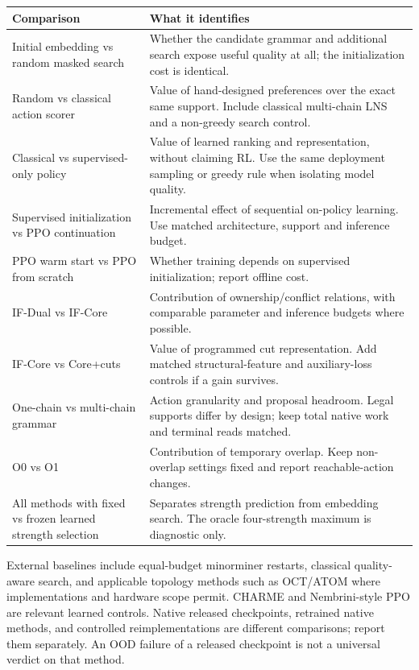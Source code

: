 \documentclass[11pt,a4paper]{article}
\theoremstyle{definition}\newtheorem{definition}[proposition]{Definition}
\begin{document}
{\small\begin{longtable}{@{}P{.24\textwidth}P{.69\textwidth}@{}}
\toprule
Comparison & What it identifies\\\midrule\endhead
Initial embedding vs random masked search & Whether the candidate grammar and additional search expose useful quality at all; the initialization cost is identical.\\
Random vs classical action scorer & Value of hand-designed preferences over the exact same support. Include classical multi-chain LNS and a non-greedy search control.\\
Classical vs supervised-only policy & Value of learned ranking and representation, without claiming RL. Use the same deployment sampling or greedy rule when isolating model quality.\\
Supervised initialization vs PPO continuation & Incremental effect of sequential on-policy learning. Use matched architecture, support and inference budget.\\
PPO warm start vs PPO from scratch & Whether training depends on supervised initialization; report offline cost.\\
IF-Dual vs IF-Core & Contribution of ownership/conflict relations, with comparable parameter and inference budgets where possible.\\
IF-Core vs Core+cuts & Value of programmed cut representation. Add matched structural-feature and auxiliary-loss controls if a gain survives.\\
One-chain vs multi-chain grammar & Action granularity and proposal headroom. Legal supports differ by design; keep total native work and terminal reads matched.\\
O0 vs O1 & Contribution of temporary overlap. Keep non-overlap settings fixed and report reachable-action changes.\\
All methods with fixed vs frozen learned strength selection & Separates strength prediction from embedding search. The oracle four-strength maximum is diagnostic only.\\
\bottomrule\end{longtable}}

External baselines include equal-budget minorminer restarts, classical quality-aware search, and applicable topology methods such as OCT/ATOM where implementations and hardware scope permit. CHARME and Nembrini-style PPO are relevant learned controls\cite{charme2024,nembrini2026}. Native released checkpoints, retrained native methods, and controlled reimplementations are different comparisons; report them separately. An OOD failure of a released checkpoint is not a universal verdict on that method.
\end{document}
